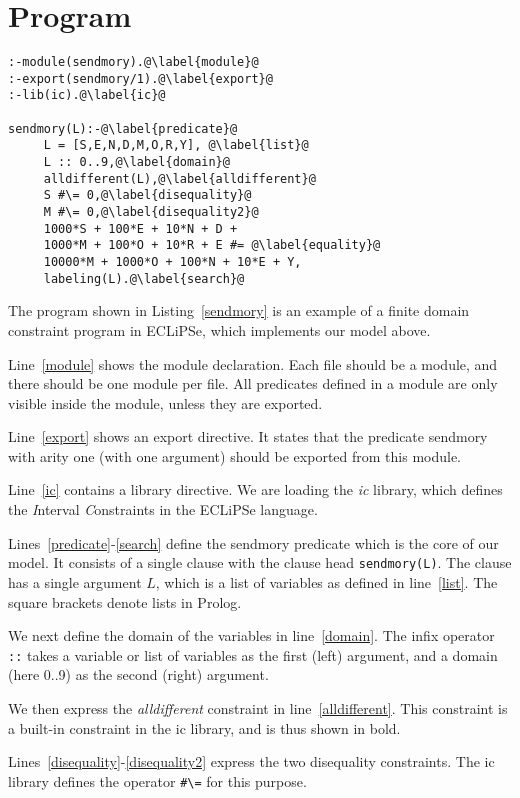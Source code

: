 \documentclass[a4paper]{article}
\begin{document}
\section{Program}
\begin{lstlisting}[float,label=sendmory,caption=Program Sendmory]
:-module(sendmory).@\label{module}@
:-export(sendmory/1).@\label{export}@
:-lib(ic).@\label{ic}@

sendmory(L):-@\label{predicate}@
     L = [S,E,N,D,M,O,R,Y], @\label{list}@
     L :: 0..9,@\label{domain}@
     alldifferent(L),@\label{alldifferent}@
     S #\= 0,@\label{disequality}@
     M #\= 0,@\label{disequality2}@
     1000*S + 100*E + 10*N + D + 
     1000*M + 100*O + 10*R + E #= @\label{equality}@
     10000*M + 1000*O + 100*N + 10*E + Y,
     labeling(L).@\label{search}@
\end{lstlisting}
The program shown in Listing~\ref{sendmory} is an example of a finite domain constraint program in ECLiPSe, which implements our model above.

Line~\ref{module} shows the module declaration. Each file should be a module, and there should be one module per file. All predicates defined in a module are only visible inside the module, unless they are exported.

Line~\ref{export} shows an export directive. It states that the predicate sendmory with arity one (with one argument) should be exported from this module.

Line~\ref{ic} contains a library directive. We are loading the {\em ic} library, which defines the {\em I}nterval {\em C}onstraints in the ECLiPSe language.
 
Lines~\ref{predicate}-\ref{search} define the sendmory predicate which is the core of our model. It consists of a single clause with the clause head \verb$sendmory(L)$. The clause has a single argument $L$, which is a list of variables as defined in line~\ref{list}. The square brackets denote lists in Prolog.

We next define the domain of the variables in line~\ref{domain}. The infix operator \verb$::$ takes a variable or list of variables as the first (left) argument, and a domain (here 0..9) as the second (right) argument.

We then express the {\em alldifferent} constraint in line~\ref{alldifferent}. This constraint is a built-in constraint in the ic library, and is thus shown in bold.

Lines~\ref{disequality}-\ref{disequality2} express the two disequality constraints. The ic library defines the operator \verb$#\=$ for this purpose.
\end{document}
